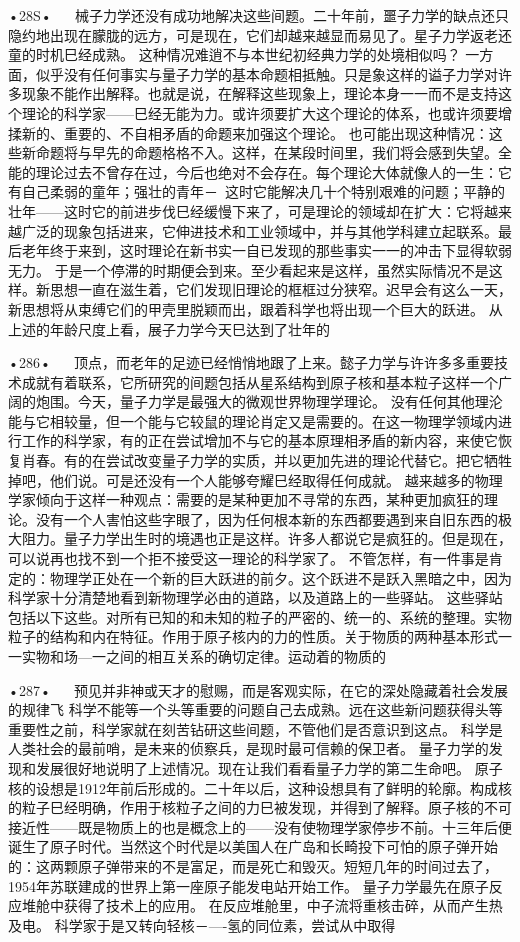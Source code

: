 •28S•
  
械子力学还没有成功地解决这些间题。二十年前，噩子力学的缺点还只隐约地出现在朦胧的远方，可是现在，它们却越来越显而易见了。星子力学返老还童的时机巳经成熟。
这种情况难逍不与本世纪初经典力学的处境相似吗？
一方面，似乎没有任何事实与量子力学的基本命题相抵触。只是象这样的谥子力学对许多现象不能作出解释。也就是说，在解释这些现象上，理论本身一一而不是支持这个理论的科学家——巳经无能为力。或许须要扩大这个理论的体系，也或许须要增揉新的、重要的、不自相矛盾的命题来加强这个理论。
也可能出现这种情况：这些新命题将与早先的命题格格不入。这样，在某段时间里，我们将会感到失望。全能的理论过去不曾存在过，今后也绝对不会存在。每个理论大体就像人的一生：它有自己柔弱的童年；强壮的青年－~这时它能解决几十个特别艰难的问题；平静的壮年——这时它的前进步伐巳经缓慢下来了，可是理论的领域却在扩大：它将越来越广泛的现象包括进来，它伸进技术和工业领域中，并与其他学科建立起联系。最后老年终于来到，这时理论在新书实一自已发现的那些事实一一的冲击下显得软弱无力。
于是一个停滞的时期便会到来。至少看起来是这样，虽然实际情况不是这样。新思想一直在滋生着，它们发现旧理论的框框过分狭窄。迟早会有这么一天，新思想将从束缚它们的甲壳里脱颖而出，跟着科学也将出现一个巨大的跃进。
从上述的年龄尺度上看，展子力学今天巳达到了壮年的

•286•
  
顶点，而老年的足迹已经悄悄地跟了上来。懿子力学与许许多多重要技术成就有着联系，它所研究的间题包括从星系结构到原子核和基本粒子这样一个广阔的炮围。今天，量子力学是最强大的微观世界物理学理论。
没有任何其他理沦能与它相较量，但一个能与它较鼠的理论肖定又是需要的。在这一物理学领域内进行工作的科学家，有的正在尝试增加不与它的基本原理相矛盾的新内容，来使它恢复肖春。有的在尝试改变量子力学的实质，并以更加先进的理论代替它。把它牺牲掉吧，他们说。可是还没有一个人能够夸耀巳经取得任何成就。
越来越多的物理学家倾向于这样一种观点：需要的是某种更加不寻常的东西，某种更加疯狂的理论。没有一个人害怕这些字眼了，因为任何根本新的东西都要遇到来自旧东西的极大阻力。量子力学出生时的境遇也正是这样。许多人都说它是疯狂的。但是现在，可以说再也找不到一个拒不接受这一理论的科学家了。
不管怎样，有一件事是肯定的：物理学正处在一个新的巨大跃进的前夕。这个跃进不是跃入黑暗之中，因为科学家十分清楚地看到新物理学必由的道路，以及道路上的一些驿站。
这些驿站包括以下这些。对所有已知的和未知的粒子的严密的、统一的、系统的整理。实物粒子的结构和内在特征。作用于原子核内的力的性质。关于物质的两种基本形式一一实物和场—一之间的相互关系的确切定律。运动着的物质的

•287•
  
预见并非神或天才的慰赐，而是客观实际，在它的深处隐藏着社会发展的规律飞
科学不能等一个头等重要的问题自己去成熟。远在这些新问题获得头等重要性之前，科学家就在刻苦钻研这些间题，不管他们是否意识到这点。
科学是人类社会的最前哨，是未来的侦察兵，是现时最可信赖的保卫者。
量子力学的发现和发展很好地说明了上述情况。现在让我们看看量子力学的第二生命吧。
原子核的设想是1912年前后形成的。二十年以后，这种设想具有了鲜明的轮廓。构成核的粒子巳经明确，作用于核粒子之间的力巳被发现，并得到了解释。原子核的不可接近性——既是物质上的也是概念上的——没有使物理学家停步不前。十三年后便诞生了原子时代。当然这个时代是以美国人在广岛和长畸投下可怕的原子弹开始的：这两颗原子弹带来的不是富足，而是死亡和毁灭。短短几年的时间过去了，1954年苏联建成的世界上第一座原子能发电站开始工作。
量子力学最先在原子反应堆舱中获得了技术上的应用。
在反应堆舱里，中子流将重核击碎，从而产生热及电。
科学家于是又转向轻核－—-氢的同位素，尝试从中取得

